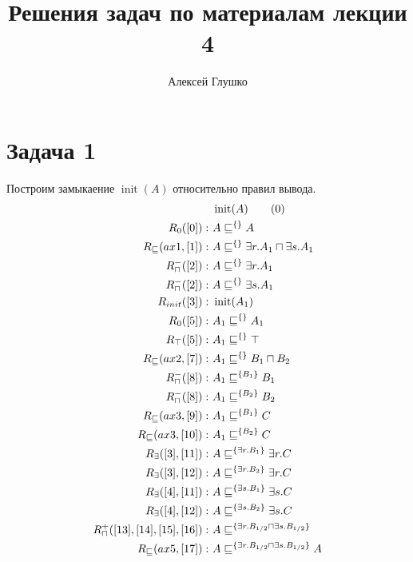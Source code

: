 \documentclass[11pt]{article}
\title{Решения задач по материалам лекции 4}
\author{Алексей Глушко}
\newcommand{\op}[1]{\operatorname{#1}}
\theoremstyle{definition}
\theoremstyle{lemma}
\theoremstyle{statement}
\newcommand{\hsome}[2]{\exists#1.#2}
\newcommand{\his}{\sqsubseteq}
\newcommand{\hand}{\sqcap}
\begin{document}
\maketitle
\section*{Задача 1}
    Построим замыкаение $\op{init}(A)$ относительно правил вывода.
    \begin{align}
        & \op{init}(A) \tag{0} \label{0} \\
        R_0(\ref{0}):~               & A \his^{\{\}} A           \label{1} \\
        R_\his(ax1, \ref{1}):~       & A \his^{\{\}} \hsome{r}{A_1} \hand \hsome{s}{A_1}           \label{2} \\
        R^-_\hand(\ref{2}):~         & A \his^{\{\}} \hsome{r}{A_1}                                \label{3} \\
        R^-_\hand(\ref{2}):~         & A \his^{\{\}} \hsome{s}{A_1}                                \label{4} \\
        R_{init}(\ref{3}):~          & \op{init}(A_1)                                              \label{5} \\
        R_0(\ref{5}):~               & A_1 \his^{\{\}} A_1                                         \label{6} \\
        R_\top(\ref{5}):~            & A_1 \his^{\{\}} \top                                        \label{7} \\
        R_\his(ax2, \ref{7}):~       & A_1 \his^{\{\}} B_1 \hand B_2                               \label{8} \\
        R^-_\hand(\ref{8}):~         & A_1 \his^{\{B_1\}} B_1                                      \label{9} \\
        R^-_\hand(\ref{8}):~         & A_1 \his^{\{B_2\}} B_2                                      \label{10} \\
        R_\his(ax3, \ref{9}):~       & A_1 \his^{\{B_1\}} C                                        \label{11} \\
        R_\his(ax3, \ref{10}):~      & A_1 \his^{\{B_2\}} C                                        \label{12} \\
        R_\exists(\ref{3},\ref{11}):~& A \his^{\{\hsome{r}{B_1}\}} \hsome{r}{C}                    \label{13} \\
        R_\exists(\ref{3},\ref{12}):~& A \his^{\{\hsome{r}{B_2}\}} \hsome{r}{C}                    \label{14} \\
        R_\exists(\ref{4},\ref{11}):~& A \his^{\{\hsome{s}{B_1}\}} \hsome{s}{C}                    \label{15} \\
        R_\exists(\ref{4},\ref{12}):~& A \his^{\{\hsome{s}{B_2}\}} \hsome{s}{C}                    \label{16} \\
        R^+_\hand(\ref{13},\ref{14},\ref{15},\ref{16}):~& A \his^{\{\hsome{r}{B_{1/2}} \hand \hsome{s}{B_{1/2}}\}}   \label{17} \\
        R_\his(ax5, \ref{17}):~      & A \his^{\{\hsome{r}{B_{1/2}} \hand \hsome{s}{B_{1/2}}\}} A  \label{18}
    \end{align}
\end{document}
